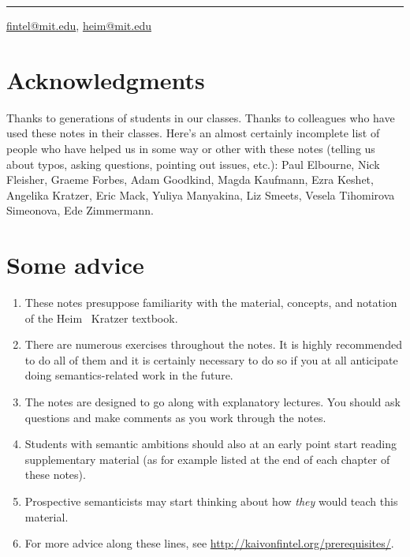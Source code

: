 \plainbreak{1}

\href{mailto:fintel@mit.edu}{fintel@mit.edu}, \href{mailto:heim@mit.edu}{heim@mit.edu}

\cleardoublepage

\null
\vfill \ba 

\section*{Acknowledgments}

Thanks to generations of students in our classes. Thanks to colleagues who have
used these notes in their classes. Here's an almost certainly incomplete list of
people who have helped us in some way or other with these notes (telling us
about typos, asking questions, pointing out issues, etc.): Paul Elbourne, Nick
Fleisher, Graeme Forbes, Adam Goodkind, Magda Kaufmann, Ezra Keshet, Angelika
Kratzer, Eric Mack, Yuliya Manyakina, Liz Smeets, Vesela Tihomirova Simeonova,
Ede Zimmermann.

\section*{Some advice}
\begin{enumerate}
\item These notes presuppose familiarity with the material, concepts, and
  notation of the Heim \amp\ Kratzer textbook.
\item There are numerous exercises throughout the notes. It is highly
  recommended to do all of them and it is certainly necessary to do so if you at
  all anticipate doing semantics-related work in the future.
\item The notes are designed to go along with explanatory lectures. You should
  ask questions and make comments as you work through the notes.
\item Students with semantic ambitions should also at an early point start
  reading supplementary material (as for example listed at the end of each
  chapter of these notes).
\item Prospective semanticists may start thinking about how \emph{they} would
  teach this material.
\item For more advice along these lines, see
  \url{http://kaivonfintel.org/prerequisites/}.
\end{enumerate}

\ab 
\vfill\null

\newpage\hbox{}
\vfill{\scshape{}}
\vfill\hbox{}\thispagestyle{cleared}
